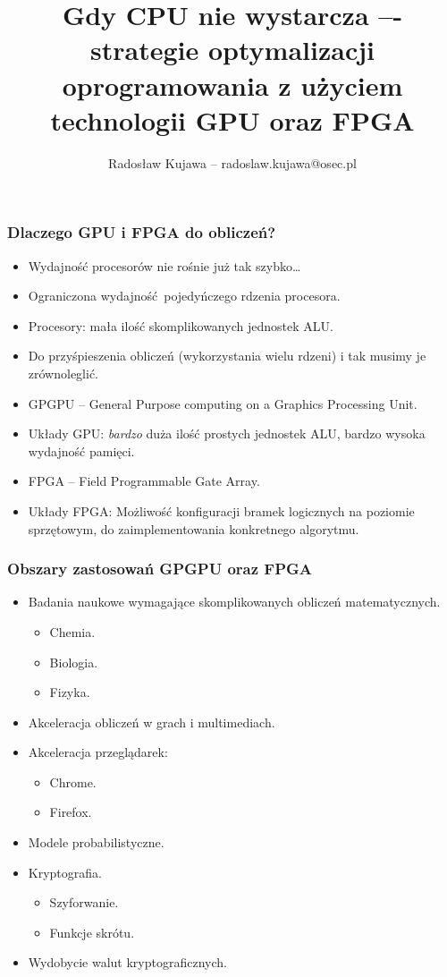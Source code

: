 \documentclass[dvipsnames,table]{beamer}
\title{Gdy CPU nie wystarcza –- strategie optymalizacji oprogramowania z użyciem technologii GPU oraz FPGA}
\author{Radosław Kujawa -- radoslaw.kujawa@osec.pl}
\institute{OSEC}
\begin{document}
\begin{frame}
	\titlepage
\end{frame}

\begin{frame}
	\frametitle{Dlaczego GPU i FPGA do obliczeń?}
\begin{itemize}
	\item Wydajność procesorów nie rośnie już tak szybko\dots
	\item Ograniczona wydajność pojedyńczego rdzenia procesora.
	\item Procesory: mała ilość skomplikowanych jednostek ALU.
	\item Do przyśpieszenia obliczeń (wykorzystania wielu rdzeni) i tak musimy je zrównoleglić.
	\item GPGPU -- General Purpose computing on a Graphics Processing Unit. 
	\item Układy GPU: {\em bardzo} duża ilość prostych jednostek ALU, bardzo wysoka wydajność pamięci.
	\item FPGA -- Field Programmable Gate Array.
	\item Układy FPGA: Możliwość konfiguracji bramek logicznych na poziomie sprzętowym, do zaimplementowania konkretnego algorytmu.
	
\end{itemize}
\end{frame}


\begin{frame}
	\frametitle{Obszary zastosowań GPGPU oraz FPGA} 
\begin{itemize}
	\item Badania naukowe wymagające skomplikowanych obliczeń matematycznych.
	\begin{itemize}
		\item Chemia.
		\item Biologia.
		\item Fizyka.
	\end{itemize}
	\item Akceleracja obliczeń w grach i multimediach.
	\item Akceleracja przeglądarek:
	\begin{itemize}
		\item Chrome.
		\item Firefox.
	\end{itemize}
	\item Modele probabilistyczne.
	\item Kryptografia.
	\begin{itemize}
		\item Szyforwanie.
		\item Funkcje skrótu.
	\end{itemize}
	\item Wydobycie walut kryptograficznych.
\end{itemize}
\end{frame}
\end{document}
